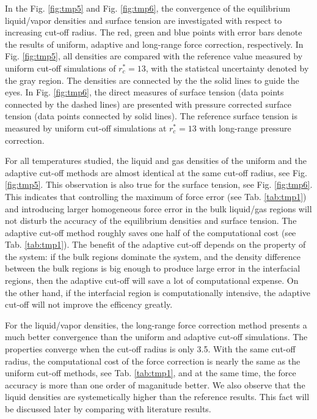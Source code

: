 \documentclass[aps,pre,preprint]{revtex4-1}
\begin{document}
In the Fig. \ref{fig:tmp5} and Fig. \ref{fig:tmp6}, the convergence of
the equilibrium liquid/vapor densities and surface tension are
investigated with respect to increasing cut-off radius. The red, green
and blue points with error bars denote the results of uniform,
adaptive and long-range force correction, respectively.  In
Fig. \ref{fig:tmp5}, all densities are compared with the reference
value measured by uniform cut-off simulations of $r_c^\ast = 13$, with
the statistcal uncertainty denoted by the gray region. The densities
are connected by the the solid lines to guide the eyes.  In
Fig. \ref{fig:tmp6}, the direct measures of surface tension (data
points connected by the dashed lines) are presented with pressure
corrected surface tension (data points connected by solid lines).  The
reference surface tension is measured by uniform cut-off simulations
at $r_c^\ast = 13$ with long-range pressure correction.


For all temperatures studied, the liquid and gas densities of the
uniform and the adaptive cut-off methods are almost identical at the
same cut-off radius, see Fig. \ref{fig:tmp5}. This observation is also
true for the surface tension, see Fig. \ref{fig:tmp6}. This indicates
that controlling the maximum of force error (see Tab. \ref{tab:tmp1})
and introducing larger homogeneous force error in the bulk liquid/gas
regions will not disturb the accuracy of the equilibrium densities and
surface tension.  The adaptive cut-off method roughly saves one half
of the computational cost (see Tab. \ref{tab:tmp1}). The benefit of
the adaptive cut-off depends on the property of the system: if the
bulk regions dominate the system, and the density difference between
the bulk regions is big enough to produce large error in the
interfacial regions, then the adaptive cut-off will save a lot of
computational expense. On the other hand, if the interfacial region is
computationally intensive, the adaptive cut-off will not improve the
efficency greatly.

For the liquid/vapor densities, the long-range force correction method
presents a much better convergence than the uniform and adaptive
cut-off simulations. The properties converge when the cut-off radius is
only 3.5.  With the same cut-off radius, the computational cost of the
force correction is nearly the same as the uniform cut-off methods,
see Tab. \ref{tab:tmp1}, and at the same time, the force accuracy is
more than one order of maganitude better.
We also observe that the liquid densities are systemetically higher
than the reference results. This fact will be discussed later by
comparing with literature results.
\end{document}
